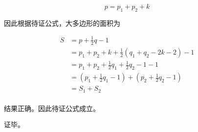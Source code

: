 \[ p = p_1 + p_2 + k \]

因此根据待证公式，大多边形的面积为

\begin{align*}
  S &= p + \frac12q - 1 \\
  &= p_1 + p_2 + k + \frac12(q_1 + q_2 - 2k - 2) - 1 \\
  &= p_1 + p_2 + \frac12q_1 + \frac12q_2 - 1 - 1 \\
  &= \left(p_1 + \frac12q_1 - 1\right) + \left(p_2 + \frac12q_2 - 1\right) \\
  &= S_1 + S_2 \\
\end{align*}

结果正确。因此待证公式成立。

证毕。

